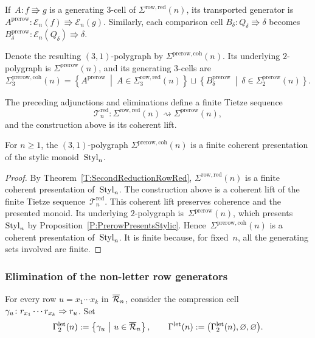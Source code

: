 \documentclass[a4paper, twoside, 11pt, english]{article}
\begin{document}
If~$A\colon f\Rrightarrow g$
is a generating $3$-cell of
$\Sigma^{\mathrm{row,red}}(n)$, its transported generator is~$
A^{\mathrm{prerow}}
\colon
\mathcal E_n(f)
\Rrightarrow
\mathcal E_n(g)$.
Similarly, each comparison cell
$B_\delta\colon Q_\delta\Rrightarrow\delta$ becomes~$
B_\delta^{\mathrm{prerow}}
\colon
\mathcal E_n(Q_\delta)
\Rrightarrow
\delta$.

Denote the resulting $(3,1)$-polygraph by
$\Sigma^{\mathrm{prerow,coh}}(n)$. Its underlying $2$-polygraph is
$\Sigma^{\mathrm{prerow}}(n)$, and its generating $3$-cells are
\[
\Sigma^{\mathrm{prerow,coh}}_3(n)
=
\left\{
A^{\mathrm{prerow}}
\ \middle|\
A\in\Sigma^{\mathrm{row,red}}_3(n)
\right\}
\sqcup
\left\{
B_\delta^{\mathrm{prerow}}
\ \middle|\
\delta\in\Sigma^{\mathrm{prerow}}_2(n)
\right\}.
\]

The preceding adjunctions and eliminations define a finite Tietze
sequence
\[
\mathcal T_n^{\mathrm{red}}\colon
\Sigma^{\mathrm{row,red}}(n)
\rightsquigarrow
\Sigma^{\mathrm{prerow}}(n),
\]
and the construction above is its coherent lift.

\begin{proposition}
\label{Prop:CoherentPreRow}
For $n\geq1$, the $(3,1)$-polygraph
$\Sigma^{\mathrm{prerow,coh}}(n)$ is a finite coherent presentation
of the stylic monoid~$\mathrm{Styl}_n$.
\end{proposition}

\begin{proof}
By Theorem~\ref{T:SecondReductionRowRed},
$\Sigma^{\mathrm{row,red}}(n)$ is a finite coherent presentation of~$\mathrm{Styl}_n$. 
The construction above is a coherent lift of the finite Tietze
sequence~$\mathcal T_n^{\mathrm{red}}$. This coherent lift preserves
coherence and the presented monoid. Its underlying $2$-polygraph is~$\Sigma^{\mathrm{prerow}}(n)$, which presents~$\mathrm{Styl}_n$ by Proposition~\ref{P:PrerowPresentsStylic}. Hence~$\Sigma^{\mathrm{prerow,coh}}(n)$ is a coherent presentation of~$\mathrm{Styl}_n$. It is finite because, for fixed~$n$, all the generating
sets involved are finite.
\end{proof}


\subsubsection{Elimination of the non-letter row generators}

For every row $u=x_1\cdots x_k$ in~$\overline{\mathcal{R}}_n$, consider the
compression cell~$
\gamma_u\colon
r_{x_1}\cdots r_{x_k}\Rightarrow r_u$.
Set
\[
\Gamma^{\mathrm{let}}_2(n)
:=
\left\{
\gamma_u
\ \middle|\
u\in\overline{\mathcal{R}}_n
\right\},
\qquad
\Gamma^{\mathrm{let}}(n)
:=
\bigl(
\Gamma^{\mathrm{let}}_2(n),
\varnothing,
\varnothing
\bigr).
\]
\end{document}
